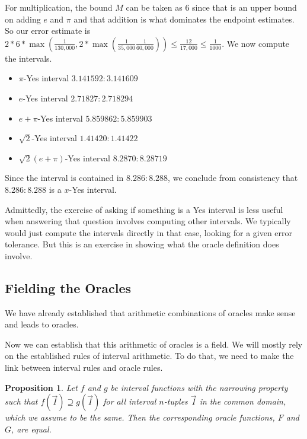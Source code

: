 \documentclass[12pt]{article}
\newtheorem{proposition}{Proposition}[subsection]
\begin{document}
For multiplication, the bound $M$ can be taken as 6 since that is an upper bound on adding $e$ and $\pi$ and that addition is what dominates the endpoint estimates. So our error estimate is $2*6*\max(\frac{1}{130,000}, 2*\max(\frac{1}{35,000}\frac{1}{60,000})) \leq \frac{12}{17,000} \leq \frac{1}{1000}$. We now compute the intervals.  
\begin{itemize}
    \item $\pi$-Yes interval $3.141592:3.141609$
    \item $e$-Yes interval $2.71827:2.718294$
    \item $e + \pi$-Yes interval $5.859862:5.859903$
    \item $\sqrt{2}$-Yes interval $1.41420:1.41422$
    \item $\sqrt{2}(e + \pi)$-Yes interval  $8.2870:8.28719$
\end{itemize}

Since the interval is contained in $8.286:8.288$, we conclude from consistency that $8.286:8.288$ is a $x$-Yes interval. 

Admittedly, the exercise of asking if something is a Yes interval is less useful when answering that question involves computing other intervals. We typically would just compute the intervals directly in that case, looking for a given error tolerance. But this is an exercise in showing what the oracle definition does involve. 



\subsection{Fielding the Oracles}

We have already established that arithmetic combinations of oracles make sense and leads to oracles. 


Now we can establish that this arithmetic of oracles is a field. We will mostly rely on the established rules of interval arithmetic. To do that, we need to make the link between interval rules and oracle rules. 


\begin{proposition}
Let $f$ and $g$ be interval functions with the narrowing property such that $f(\vec{I}) \supseteq g(\vec{I})$ for all interval $n$-tuples $\vec{I}$ in the common domain, which we assume to be the same. Then the corresponding oracle functions, $F$ and $G$, are equal.  
\end{proposition}
\end{document}
